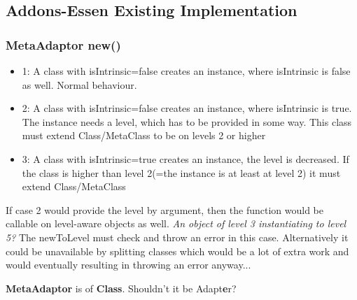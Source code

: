 \documentclass{scrreprt}
\newcounter{myCounter}[subsubsection]
\newcommand{\layerThree}[1]{\subsection{#1} \setcounter{myCounter}{0}}
\newcommand{\layerFour}[1]{\subsubsection{#1}}
\begin{document}
\layerThree{Addons-Essen Existing Implementation}

\layerFour{MetaAdaptor new()}
\begin{itemize}
	\item 1: A class with isIntrinsic=false creates an instance, where isIntrinsic is false as well. Normal behaviour.
	\item 2: A class with isIntrinsic=false creates an instance, where isIntrinsic is true. The instance needs a level, which has to be provided in some way. This class must extend Class/MetaClass to be on levels 2 or higher
	\item 3: A class with isIntrinsic=true creates an instance, the level is decreased. If the class is higher than level 2(=the instance is at least at level 2) it must extend Class/MetaClass
\end{itemize}

If case 2 would provide the level by argument, then the function would be callable on level-aware objects as well. \textit{An object of level 3 instantiating to level 5?} The newToLevel must check and throw an error in this case. Alternatively it could be unavailable by splitting classes which would be a lot of extra work and would eventually resulting in throwing an error anyway...

\textbf{MetaAdaptor} is of \textbf{Class}. Shouldn't it be Adapt\textbf{e}r?
\end{document}

